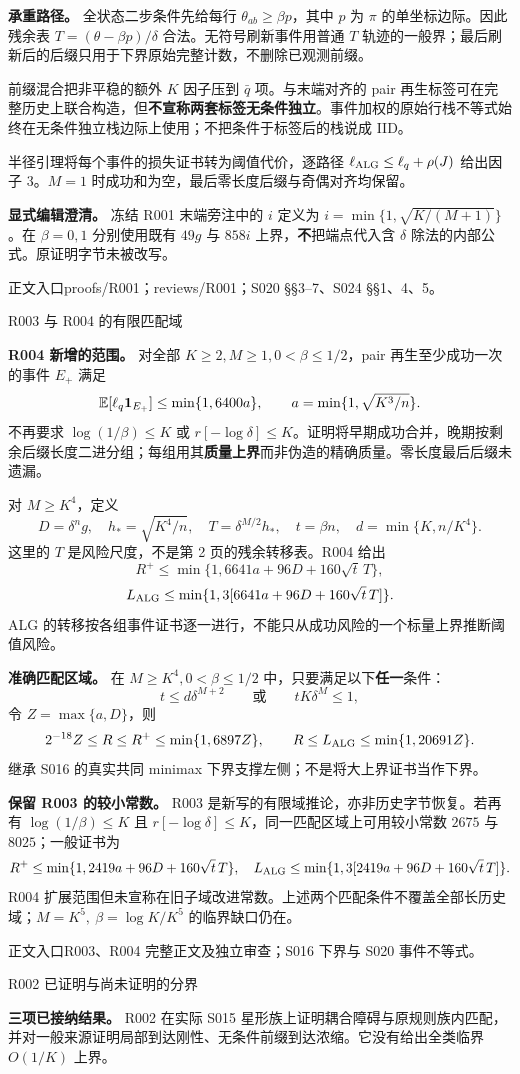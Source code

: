 \documentclass[11pt,a4paper]{article}
\newcommand{\head}[2]{{\small\sffamily #1}\par\vspace{2pt}{\LARGE\bfseries #2}\par\vspace{5pt}}
\newcommand{\entry}[1]{\vfill{\noindent\small\raggedright 正文入口\quad #1\par}}
\begin{document}
\textbf{承重路径。} 全状态二步条件先给每行 $\theta_{ab}\ge\beta p$，其中 $p$ 为 $\pi$ 的单坐标边际。因此残余表 $T=(\theta-\beta p)/\delta$ 合法。无符号刷新事件用普通 $T$ 轨迹的一般界；最后刷新后的后缀只用于下界原始完整计数，不删除已观测前缀。

前缀混合把非平稳的额外 $K$ 因子压到 $\bar q$ 项。与末端对齐的 pair 再生标签可在完整历史上联合构造，但\textbf{不宣称两套标签无条件独立}。事件加权的原始行栈不等式始终在无条件独立栈边际上使用；不把条件于标签后的栈说成 IID。

半径引理将每个事件的损失证书转为阈值代价，逐路径
$\ell_{\rm ALG}\le\ell_q+\rho(J)$ 给出因子 $3$。$M=1$ 时成功和为空，最后零长度后缀与奇偶对齐均保留。

\textbf{显式编辑澄清。} 冻结 R001 末端旁注中的 $i$ 定义为
$i=\min\{1,\sqrt{K/(M+1)}\}$。在 $\beta=0,1$ 分别使用既有 $49g$ 与 $858i$ 上界，\textbf{不}把端点代入含 $\delta$ 除法的内部公式。原证明字节未被改写。
\entry{proofs/R001；reviews/R001；S020 §§3--7、S024 §§1、4、5。}
\newpage
\head{R003 与 R004 的有限匹配域}{分组再生去掉 moderate log 限制}
\textbf{R004 新增的范围。} 对全部 $K\ge2,M\ge1,0<\beta\le1/2$，pair 再生至少成功一次的事件 $E_+$ 满足
\[
 \mathbb E[\ell_q\mathbf1_{E_+}]\le\min\{1,6400a\},\qquad
 a=\min\{1,\sqrt{K^3/n}\}.
\]
不再要求 $\log(1/\beta)\le K$ 或 $r[-\log\delta]\le K$。证明将早期成功合并，晚期按剩余后缀长度二进分组；每组用其\textbf{质量上界}而非伪造的精确质量。零长度最后后缀未遗漏。

对 $M\ge K^4$，定义
\[
 D=\delta^n g,\quad h_* =\sqrt{K^4/n},\quad
 T=\delta^{M/2}h_*,\quad t=\beta n,\quad
 d=\min\{K,n/K^4\}.
\]
这里的 $T$ 是风险尺度，不是第 2 页的残余转移表。R004 给出
\[
 R^+\le\min\{1,6641a+96D+160\sqrt t\,T\},
\]
\[
 L_{\rm ALG}\le\min\{1,3[6641a+96D+160\sqrt t\,T]\}.
\]
ALG 的转移按各组事件证书逐一进行，不能只从成功风险的一个标量上界推断阈值风险。

\textbf{准确匹配区域。} 在 $M\ge K^4,0<\beta\le1/2$ 中，只要满足以下\textbf{任一}条件：
\[
 t\le d\delta^{M+2}\qquad\text{或}\qquad tK\delta^M\le1,
\]
令 $Z=\max\{a,D\}$，则
\[
 2^{-18}Z\le R\le R^+\le\min\{1,6897Z\},
 \qquad R\le L_{\rm ALG}\le\min\{1,20691Z\}.
\]
继承 S016 的真实共同 minimax 下界支撑左侧；不是将大上界证书当作下界。

\textbf{保留 R003 的较小常数。} R003 是新写的有限域推论，亦非历史字节恢复。若再有
$\log(1/\beta)\le K$ 且 $r[-\log\delta]\le K$，同一匹配区域上可用较小常数 $2675$ 与 $8025$；一般证书为
\[
 R^+\le\min\{1,2419a+96D+160\sqrt t\,T\},\quad
 L_{\rm ALG}\le\min\{1,3[2419a+96D+160\sqrt t\,T]\}.
\]
R004 扩展范围但未宣称在旧子域改进常数。上述两个匹配条件不覆盖全部长历史域；$M=K^5,\ \beta=\log K/K^5$ 的临界缺口仍在。
\entry{R003、R004 完整正文及独立审查；S016 下界与 S020 事件不等式。}
\newpage
\head{R002 已证明与尚未证明的分界}{完整前缀证据仍不等于全类闭合}
\textbf{三项已接纳结果。} R002 在实际 S015 星形族上证明耦合障碍与原规则族内匹配，并对一般来源证明局部到达刚性、无条件前缀到达浓缩。它没有给出全类临界 $O(1/K)$ 上界。
\end{document}
